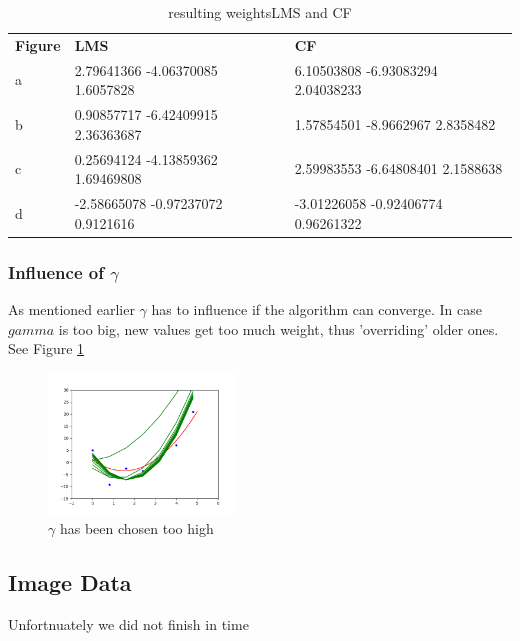 \begin{table}[]
\begin{tabular}{lll}
\textbf{Figure} & \textbf{LMS} & \textbf{CF} \\
a               &        2.79641366 -4.06370085  1.6057828       &     6.10503808 -6.93083294  2.04038233       \\
b               &      0.90857717 -6.42409915  2.36363687        &     1.57854501 -8.9662967   2.8358482          \\
c               &        0.25694124 -4.13859362  1.69469808      &        2.59983553 -6.64808401  2.1588638         \\
d               &        -2.58665078 -0.97237072  0.9121616       &         -3.01226058 -0.92406774  0.96261322        \\
\end{tabular}
\caption{\label{tab:weights}resulting weights{LMS} and {CF}}
\end{table}


\subsubsection{Influence of $\gamma$ }

As mentioned earlier $\gamma$ has to influence if the algorithm can converge. In case $gamma$ is too big, new values get too much weight, thus 'overriding' older ones. See Figure \ref {fig:gamma}

\begin{figure}[!h]
\begin{center}
\centering
\includegraphics[width=5cm]{fig_gamma.png}
\end{center}
\caption{\label{fig:gamma} $\gamma$ has been chosen too high }
\end{figure}




\subsection{Image Data}
Unfortnuately we did not finish in time 
